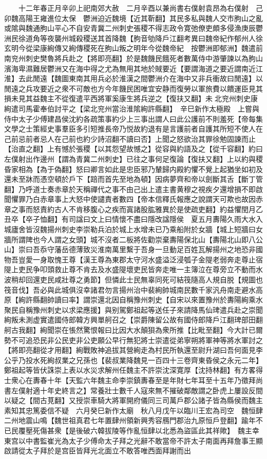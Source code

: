 　　十二年春正月辛卯上祀南郊大赦　二月辛酉以兼尚書右僕射袁昂為右僕射　己卯魏高陽王雍進位太保　鬱洲迫近魏境【近其靳翻】其民多私與魏人交市朐山之亂或隂與魏通朐山平心不自安青冀二州刺史張稷不得志政令寛弛僚吏頗多侵漁庚辰鬱洲民徐道角等夜襲州城殺稷送其首降魏【胊音劬降戶江翻考異曰魏帝紀作郁州人徐玄明今從梁康絢傳又絢傳稷死在朐山叛之明年今從魏帝紀　按鬱洲即郁洲】魏遣前南兖州刺史樊魯將兵赴之【將即亮翻】於是魏饑民餓死者數萬侍中游肇諫以為朐山濱海卑濕難居鬱洲又在海中得之尤為無用其地於賊要近【要謂海道之要近謂南近江淮】去此閒遠【魏圖東南其用兵必於淮漢之間鬱洲介在海中又非兵衝故曰閒遠】以閒遠之兵攻要近之衆不可敵也方今年饑民困唯宜安静而復勞以軍旅費以饋運臣見其損未見其益魏主不從復遣平西將軍奚康生將兵逆之【復扶又翻】未北兖州刺史康絢遣司馬霍奉伯討平之【梁北兖州當治淮隂絢許縣翻】　辛巳新作太極殿　上嘗與侍中太子少傅建昌侯沈約各疏策事約少上三事出謂人曰此公護前不則羞死【帝每集文學之士策經史事羣臣多引短推長帝乃悦故約退有是言護前者自護其所短不使人在己前忌前者忌人在己前也約少詩沼翻不讀曰否】上聞之怒欲治其罪徐勉固諫而止【治直之翻】上有憾於張稷【以其怨望故憾之】從容與約語及之【從千容翻】約曰左僕射出作邊州【謂為青冀二州刺史】已往之事何足復論【復扶又翻】上以約與稷昏家相為【為于偽翻】怒曰卿言如此是忠臣邪乃輦歸内殿約懼不覺上起猶坐如初及還未至牀而憑空頓於戶下【踣而首先至地為頓】因病夢齊和帝以劍斷其舌【斷丁管翻】乃呼道士奏赤章於天稱禪代之事不由己出上遣主書黄穆之視疾夕還增損不即啟聞懼罪乃白赤章事上大怒中使譴責者數四【帝本信釋氏報應之說謂天可欺也故因赤章之事而怒責約古人不肯移腹心之疾而寘諸股肱雅異於是使疏吏翻】約益懼閏月乙丑卒【卒子恤翻】有司諡曰文上曰情懷不盡曰隱改諡隱侯　夏五月夀陽久雨大水入城廬舍皆沒魏揚州刺史李崇勒兵泊於城上水增未已乃乘船附於女牆【城上短牆曰女牆所謂陴也今人謂之女頭】城不沒者二板將佐勸崇棄夀陽保北山【夀陽北山即八公山】崇曰吾忝守藩岳德薄致災淮南萬里繫于吾身一旦動足百姓瓦解揚州之地恐非國物吾豈愛一身取愧王尊【漢王尊為東郡太守河水盛溢泛浸瓠子金隄老弱奔走尊止宿隄上吏民争叩頭救止尊不肯去及水盛隄壞吏民皆奔走唯一主簿泣在尊旁立不動而水波稍却回還吏民咸壯尊之勇節】但憐此士民無辜同死可結筏隨高人規自脱【規圖也筏音伐】吾必與此城俱沒幸諸君勿言揚州治中裴絢帥城南民數千家汎舟南走避水高原【絢許縣翻帥讀曰率】謂崇還北因自稱豫州刺史【自宋以來置豫州於夀陽絢乘水聚民自稱豫州刺史以求梁應援】與别駕鄭祖起等送任子來請降馬仙琕遣兵赴之崇聞絢叛未測虚實遣國侍郎韓方興單舸召之【崇爵陳留公故有國侍郎降戶江翻琕部田翻舸古我翻】絢聞崇在悵然驚恨報曰比因大水顛狽為衆所推【比毗至翻】今大計已爾勢不可追恐民非公民吏非公吏願公早行無犯將士崇遣從弟寧朔將軍神等將水軍討之【將即亮翻從才用翻】絢戰敗神追拔其營絢走為村民所執還至尉升湖曰吾何面見李公乎乃投水死絢叔業之兄孫也【裴叔業降魏見一百四十三卷齊東昏侯之永元二年】鄭祖起等皆伏誅崇上表以水災求解州任魏主不許崇沈深寛厚【沈持林翻】有方畧得士衆心在夀春十年【天監六年魏主命李崇鎮夀春至是年財七年耳至十五年乃徵拜尚書左僕射適十年史終言之】常養壯士數千人寇來無不摧破鄰敵謂之卧虎上屢設反間以疑之【間古莧翻】又授崇車騎大將軍開府儀同三司萬戶郡公諸子皆為縣侯而魏主素知其忠篤委信不疑　六月癸巳新作太廟　秋八月戊午以臨川王宏為司空　魏恒肆二州地震山鳴【魏世祖真君七年置肆州領新興秀容鴈門郡治九原恒戶登翻】踰年不已民覆壓死傷甚衆【是後破六韓拔陵等作亂恒肆以北悉為盜區此其祥歟】　魏主幸東宫以中書監崔光為太子少傅命太子拜之光辭不敢當帝不許太子南面再拜詹事王顯啟請從太子拜於是宫臣皆拜光北面立不敢答唯西面拜謝而出

